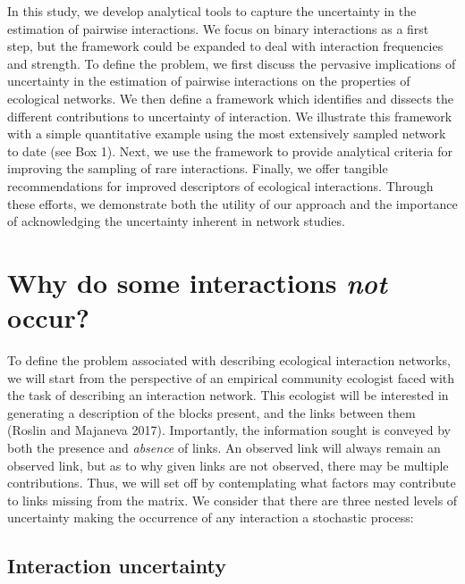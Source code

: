 \documentclass[12pt]{article}
\begin{document}
    In this study, we develop analytical tools to capture the uncertainty in the estimation of pairwise interactions. We focus on binary interactions as a first step, but the framework could be expanded to deal with interaction frequencies and strength. To define the problem, we first discuss the pervasive implications of uncertainty in the estimation of pairwise interactions on the properties of ecological networks. We then define a framework which identifies and dissects the different contributions to uncertainty of interaction. We illustrate this framework with a simple quantitative example using the most extensively sampled network to date (see Box 1). Next, we use the framework to provide analytical criteria for improving the sampling of rare interactions. Finally, we offer tangible recommendations for improved descriptors of ecological interactions. Through these efforts, we demonstrate both the utility of our approach and the importance of acknowledging the uncertainty inherent in network studies.


\section*{Why do some interactions \emph{not} occur?}

  To define the problem associated with describing ecological interaction networks, we will start from the perspective of an empirical community ecologist faced with the task of describing an interaction network. This ecologist will be interested in generating a description of the blocks present, and the links between them (Roslin and Majaneva 2017).  Importantly, the information sought is conveyed by both the presence and \emph{absence} of links. An observed link will always remain an observed link, but as to why given links are not observed, there may be multiple contributions. Thus, we will set off by contemplating what factors may contribute to links missing from the matrix. We consider that there are three nested levels of uncertainty making the occurrence of any interaction a stochastic process:

    \subsection*{Interaction uncertainty} 
\end{document}
